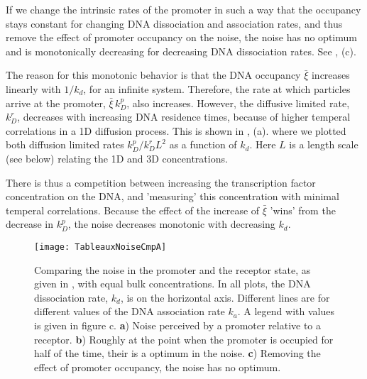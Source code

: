 If we change the intrinsic rates of the promoter in such a way that the occupancy stays constant for changing DNA dissociation and association rates, and thus remove the effect of promoter occupancy on the noise, the noise has no optimum and is monotonically decreasing for decreasing DNA dissociation rates. See , (c). 

The reason for this monotonic behavior is that the DNA occupancy $\bar{\xi}$ increases linearly with $1/k_d$, for an infinite system. Therefore, the rate at which particles arrive at the promoter, $\bar{\xi}\,k_D^p$, also increases. However, the diffusive limited rate, $k_D^r$, decreases with increasing DNA residence times, because of higher temperal correlations in a 1D diffusion process. This is shown in , (a). where we plotted both diffusion limited rates $k_D^p/k_D^r L^{2}$ as a function of $k_d$. Here $L$ is a length scale (see below) relating the 1D and 3D concentrations. 

There is thus a competition between increasing the transcription factor concentration on the DNA, and 'measuring' this concentration with minimal temperal correlations. Because the effect of the increase of $\bar{\xi}$ 'wins' from the decrease in $k_D^p$, the noise decreases monotonic with decreasing $k_d$.

\begin{figure}[ht!]
\centering
\texttt{[image: TableauxNoiseCmpA]}
\caption{ Comparing the noise in the promoter and the receptor state, as given in , with equal bulk concentrations. In all plots, the DNA dissociation rate, $k_d$, is on the horizontal axis. Different lines are for different values of the DNA association rate $k_a$. A legend with values is given in figure c. {\bf a}) Noise perceived by a promoter relative to a receptor. {\bf b}) Roughly at the point when the promoter is occupied for half of the time, their is a optimum in the noise. {\bf c}) Removing the effect of promoter occupancy, the noise has no optimum.
}
\end{figure}

